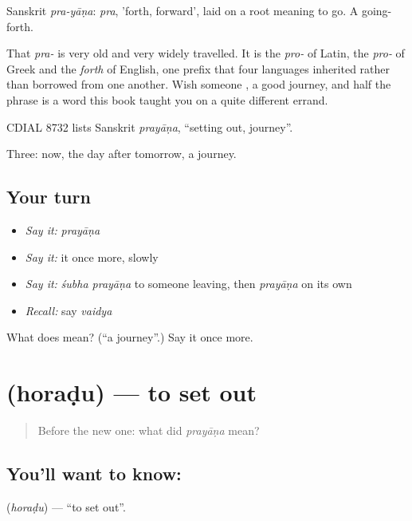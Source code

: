 Sanskrit \emph{pra-yāṇa}: \emph{pra}, 'forth, forward', laid on a root meaning to go. A going-forth.

That \emph{pra-} is very old and very widely travelled. It is the \emph{pro-} of Latin, the \emph{pro-} of Greek and the \emph{forth} of English, one prefix that four languages inherited rather than borrowed from one another. Wish someone  , a good journey, and half the phrase is a word this book taught you on a quite different errand.

CDIAL 8732 lists Sanskrit \emph{prayāṇa}, \textquotedblleft{}setting out, journey\textquotedblright{}.

\begin{grammarlens}[title={What you've built}]
Three: now, the day after tomorrow, a journey.
\end{grammarlens}

\subsection*{Your turn}
\begin{itemize}
\raggedright
  \item \emph{Say it:} \emph{prayāṇa}
  \item \emph{Say it:} it once more, slowly
  \item \emph{Say it:} \emph{śubha prayāṇa} to someone leaving, then \emph{prayāṇa} on its own
  \item \emph{Recall:} say \emph{vaidya}
\end{itemize}

\begin{tcolorbox}[breakable,colback=teal!4,colframe=teal!35!black,title={Before you move on}]
What does  mean? (\textquotedblleft{}a journey\textquotedblright{}.) Say it once more.
\end{tcolorbox}
\section[\texorpdfstring{\kn{ಹೊರಡು} (horaḍu)}{ಹೊರಡು (horaḍu)}]{ (horaḍu) — to set out}

\label{lesson:KA-C50-set-out}



\begin{quote}
Before the new one: what did \emph{prayāṇa} mean?
\end{quote}

\subsection*{You'll want to know: }
\textbf{} (\emph{horaḍu}) — \textquotedblleft{}to set out\textquotedblright{}.

